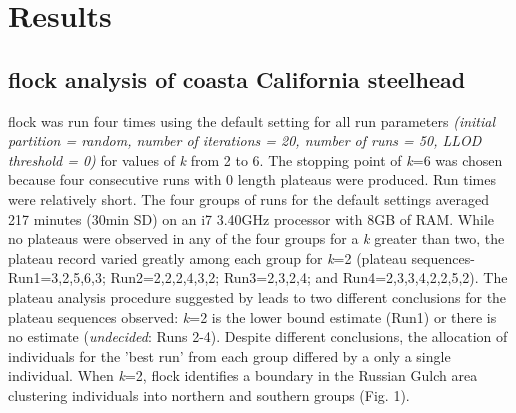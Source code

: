 \section*{Results}

\subsection*{{\sc flock} analysis of coasta California steelhead} 
{\sc flock} was run four times using the default setting for all run parameters \textit{(initial partition = random, number of iterations = 20, number of runs = 50, LLOD threshold = 0)} for values of \textit{k} from 2 to 6. The stopping point of \textit{k}=6 was chosen because four consecutive runs with 0 length plateaus were produced. 
Run times were relatively short. The four groups of runs for the default settings averaged 217 minutes (30min SD) on an i7 3.40GHz processor with 8GB of RAM. While no plateaus were observed in any of the four groups for a \textit{k} greater than two, the plateau record varied greatly among each group for \textit{k}=2 (plateau sequences- Run1=3,2,5,6,3; Run2=2,2,2,4,3,2; Run3=2,3,2,4; and Run4=2,3,3,4,2,2,5,2). The plateau analysis procedure suggested by \citet{Duc&Tur2012} leads to two different conclusions for the plateau sequences observed: \textit{k}=2 is the lower bound estimate (Run1) or there is no estimate (\textit{undecided}: Runs 2-4). Despite different conclusions, the allocation of individuals for the 'best run' from each group differed by a only a single individual. When \textit{k}=2, {\sc flock} identifies a boundary in the Russian Gulch area clustering individuals into northern and southern groups (Fig. 1). 

